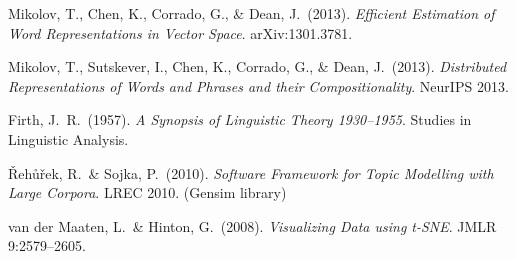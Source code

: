 \documentclass[11pt,a4paper]{article}
\begin{document}
\begin{enumerate}[leftmargin=2em, label={[\arabic*]}]
  \item Mikolov, T., Chen, K., Corrado, G., \& Dean, J.\ (2013). \textit{Efficient Estimation of Word Representations in Vector Space}. arXiv:1301.3781.
  \item Mikolov, T., Sutskever, I., Chen, K., Corrado, G., \& Dean, J.\ (2013). \textit{Distributed Representations of Words and Phrases and their Compositionality}. NeurIPS 2013.
  \item Firth, J.~R.\ (1957). \textit{A Synopsis of Linguistic Theory 1930--1955}. Studies in Linguistic Analysis.
  \item \v{R}eh\r{u}\v{r}ek, R.\ \& Sojka, P.\ (2010). \textit{Software Framework for Topic Modelling with Large Corpora}. LREC 2010. (Gensim library)
  \item van der Maaten, L.\ \& Hinton, G.\ (2008). \textit{Visualizing Data using t-SNE}. JMLR 9:2579--2605.
\end{enumerate}
\end{document}
